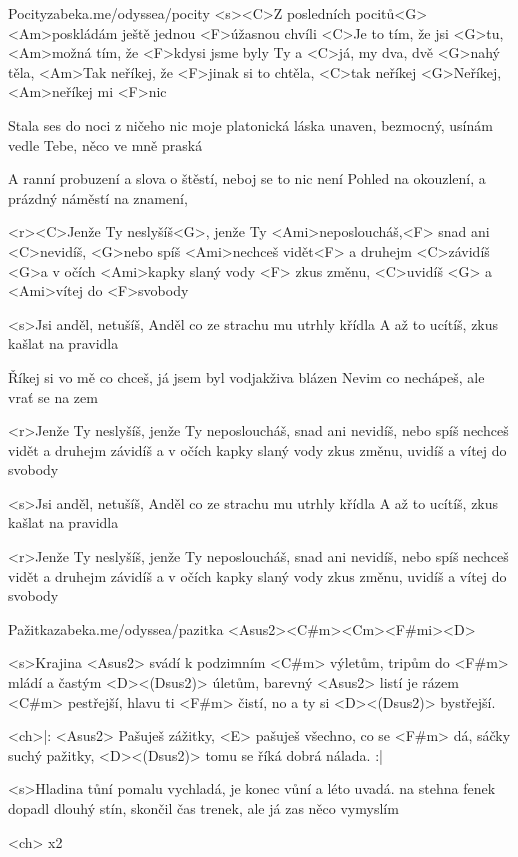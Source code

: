 \begin{song}{30}{Pocity}{zabeka.me/odyssea/pocity}
<s><C>Z posledních pocitů<G>
<Am>poskládám ještě jednou <F>úžasnou chvíli
<C>Je to tím, že jsi <G>tu,
<Am>možná tím, že <F>kdysi jsme byly Ty a <C>já,
my dva, dvě <G>nahý těla,
<Am>Tak neříkej, že <F>jinak si to chtěla,
<C>tak neříkej
<G>Neříkej, <Am>neříkej mi <F>nic

Stala ses do noci
z ničeho nic moje platonická láska
unaven, bezmocný, 
usínám vedle Tebe, něco ve mně praská

A ranní probuzení
a slova o štěstí, neboj se to nic není
Pohled na okouzlení,
a prázdný náměstí na znamení,

<r><C>Jenže Ty neslyšíš<G>, 
jenže Ty <Ami>neposloucháš,<F>
snad ani <C>nevidíš, 
<G>nebo spíš <Ami>nechceš vidět<F>
a druhejm <C>závidíš
<G>a v očích <Ami>kapky slaný vody <F>
zkus změnu, <C>uvidíš <G>
a <Ami>vítej do <F>svobody

<s>Jsi anděl, netušíš,
Anděl co ze strachu mu utrhly křídla
A až to ucítíš, zkus kašlat na pravidla

Říkej si vo mě co chceš,
já jsem byl vodjakživa blázen
Nevim co nechápeš,
ale vrať se na zem

<r>Jenže Ty neslyšíš,
jenže Ty neposloucháš,
snad ani nevidíš, 
nebo spíš nechceš vidět
a druhejm závidíš
a v očích kapky slaný vody 
zkus změnu, uvidíš
a vítej do svobody

<s>Jsi anděl, netušíš,
Anděl co ze strachu mu utrhly křídla
A až to ucítíš, zkus kašlat na pravidla

<r>Jenže Ty neslyšíš,
jenže Ty neposloucháš,
snad ani nevidíš, 
nebo spíš nechceš vidět
a druhejm závidíš
a v očích kapky slaný vody 
zkus změnu, uvidíš
a vítej do svobody 

\end{song}
\begin{song}{31}{Pažitka}{zabeka.me/odyssea/pazitka}
<Asus2><C#m><Cm><F#mi><D>

<s>Krajina <Asus2> svádí k podzimním <C#m> výletům,
tripům do <F#m> mládí a častým <D><(Dsus2)> úletům,
barevný <Asus2> listí je rázem <C#m> pestřejší,
hlavu ti <F#m> čistí, no a ty si <D><(Dsus2)> bystřejší.

<ch>|: <Asus2> Pašuješ zážitky,
<E> pašuješ všechno, co se <F#m> dá,
sáčky suchý pažitky,
<D><(Dsus2)> tomu se říká dobrá nálada. :|

<s>Hladina tůní pomalu vychladá,
je konec vůní a léto uvadá.
na stehna fenek dopadl dlouhý stín,
skončil čas trenek, ale já zas něco vymyslím

<ch>
x2


\end{song}
